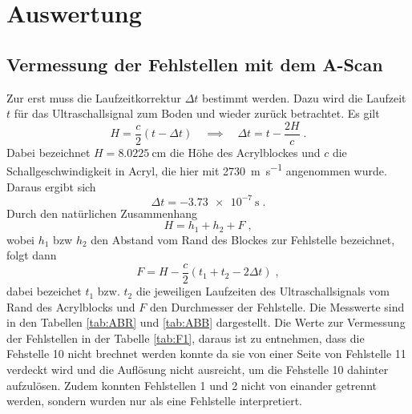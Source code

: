\section{Auswertung}
\label{sec:Auswertung}

\subsection{Vermessung der Fehlstellen mit dem A-Scan}
Zur erst muss die Laufzeitkorrektur $\Delta t$ bestimmt werden.
Dazu wird die Laufzeit $t$
für das Ultraschallsignal zum Boden und wieder zurück betrachtet.
Es gilt
\begin{equation*}
  H = \frac{c}{2} \left( t -\Delta t\right)
  \quad \implies \quad
  \Delta t = t - \frac{2H}{c}\;.
\end{equation*}
Dabei bezeichnet $H = \SI{8.0225}{\centi\meter}$ die Höhe des Acrylblockes
und $c$ die Schallgeschwindigkeit
in Acryl, die hier mit \SI{2730}{\meter \per \second} \cite{oly} angenommen wurde.
Daraus ergibt sich
\begin{equation*}
  \Delta t = -\SI{3.73e-7}{\second}\;.
\end{equation*}
Durch den natürlichen Zusammenhang
\begin{equation*}
  H = h_1 + h_2 + F \; ,
\end{equation*}
wobei $ h_1 $ bzw $ h_2$ den Abstand vom Rand des Blockes zur Fehlstelle
bezeichnet, folgt dann
\begin{equation}
  F = H-\frac{c}{2}\left(t_1 +t_2 - 2\Delta t \right) \; ,
  \label{eqn:F}
\end{equation}
dabei bezeichet $t_1$ bzw. $t_2$ die jeweiligen Laufzeiten des Ultraschallsignals
vom Rand des Acrylblocks und $F$ den Durchmesser der Fehlstelle. Die Messwerte
sind in den Tabellen \ref{tab:ABR} und \ref{tab:ABB} dargestellt. Die Werte
zur Vermessung der Fehlstellen in der Tabelle \ref{tab:F1}, daraus ist zu
entnehmen, dass die Fehstelle 10 nicht brechnet werden konnte da sie von
einer Seite von Fehlstelle 11 verdeckt wird und die Auflösung nicht ausreicht,
um die Fehstelle 10 dahinter aufzulösen. Zudem konnten Fehlstellen 1 und 2
nicht von einander getrennt werden, sondern wurden nur als eine Fehlstelle
interpretiert.

